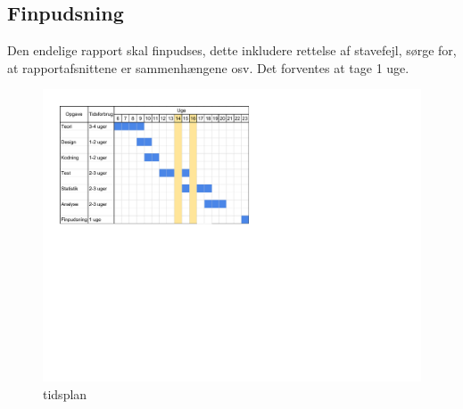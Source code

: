 \documentclass{article}
\begin{document}
\subsection{Finpudsning}
Den endelige rapport skal finpudses, dette inkludere rettelse af stavefejl, sørge for, at rapportafsnittene er sammenhængene osv. Det forventes at tage 1 uge.

\begin{figure}[h]
\centering
\label{fig:tidsplan}
\includegraphics[]{tidsplan.pdf}
\caption{tidsplan}
\end{figure}

\nocite{*}
\newpage


\end{document}
